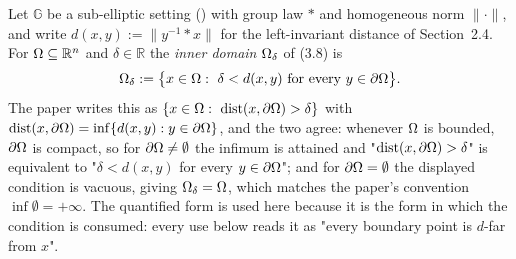 \begin{definition}
Let $\mathbb G$ be a sub-elliptic setting () with group law $*$ and
homogeneous norm $\|\cdot\|$, and write $d(x,y):=\|y^{-1}*x\|$ for the left-invariant
distance of Section~2.4. For $\Omega\subseteq\mathbb R^{n}$ and $\delta\in\mathbb R$ the
\emph{inner domain} $\Omega_\delta$ of (3.8) is
\[
 \Om_\delta:=\big\{x\in\Om:\ \delta<d(x,y)\ \text{for every}\ y\in\del\Om\big\} .
\]
The paper writes this as $\{x\in\Om:\ \dist(x,\del\Om)>\delta\}$ with
$\operatorname{dist}(x,\partial\Omega)=\inf\{d(x,y):y\in\partial\Omega\}$, and the two agree: whenever $\Omega$ is
bounded, $\partial\Omega$ is compact, so for $\partial\Omega\ne\emptyset$ the infimum is attained and
"$\operatorname{dist}(x,\partial\Omega)>\delta$" is equivalent to "$\delta<d(x,y)$ for every $y\in\partial\Omega$";
and for $\partial\Omega=\emptyset$ the displayed condition is vacuous, giving $\Omega_\delta=\Omega$,
which matches the paper's convention $\inf\emptyset=+\infty$. The quantified form is used
here because it is the form in which the condition is consumed: every use below reads it as
"every boundary point is $d$-far from $x$".
\end{definition}
